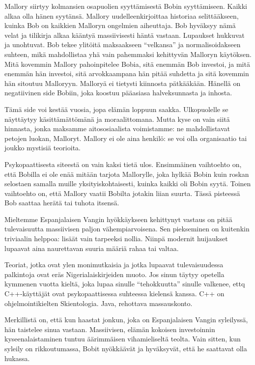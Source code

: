 Mallory siirtyy kolmansien osapuolien syyttämisestä Bobin syyttämiseen. Kaikki alkaa olla hänen syytänsä. Mallory uudelleenkirjoittaa historiaa selittääkseen, kuinka Bob on kaikkien Malloryn ongelmien aiheuttaja. Bob hyväksyy nämä velat ja tilikirja alkaa kääntyä massiivisesti häntä vastaan. Lupaukset hukkuvat ja unohtuvat. Bob tekee ylitöitä maksaakseen ``velkansa'' ja normalisoidakseen suhteen, mikä mahdollistaa yhä vain pahemmaksi kehittyvän Malloryn käytöksen. Mitä kovemmin Mallory pahoinpitelee Bobia, sitä enemmän Bob investoi, ja mitä enemmän hän investoi, sitä arvokkaampana hän pitää suhdetta ja sitä kovemmin hän sitoutuu Malloryyn. Malloryä ei tietysti kiinnosta pätkääkään. Hänellä on negatiivinen side Bobiin, joka koostuu pääasiasa halveksunnasta ja inhosta.

Tämä side voi kestää vuosia, jopa elämän loppuun saakka. Ulkopuolelle se näyttäytyy käsittämättömänä ja moraalittomana. Mutta kyse on vain siitä hinnasta, jonka maksamme aitososiaalista voimistamme: ne mahdollistavat petojen luokan, Malloryt. Mallory ei ole aina henkilö: se voi olla organisaatio tai joukko mystisiä teorioita.

Psykopaattisesta siteestä on vain kaksi tietä ulos. Ensimmäinen vaihtoehto on, että Bobilla ei ole enää mitään tarjota Mallorylle, joka hylkää Bobin kuin roskan selostaen samalla muille yksityiskohtaisesti, kuinka kaikki oli Bobin syytä. Toinen vaihtoehto on, että Mallory vaatii Bobilta jotakin liian suurta. Tässä pisteessä Bob saattaa herätä tai tuhota itsensä.

Mieltemme Espanjalaisen Vangin hyökkäykseen kehittynyt vastaus on pitää tulevaisuutta massiivisen paljon vähempiarvoisena. Sen piekseminen on kuitenkin triviaalin helppoa: lisäät vain tarpeeksi nollia. Niinpä modernit huijaukset lupaavat aina naurettavan suuria määriä rahaa tai valtaa.

Teoriat, jotka ovat ylen monimutkaisia ja jotka lupaavat tulevaisuudessa palkintoja ovat eräs Nigerialaiskirjeiden muoto. Jos sinun täytyy opetella kymmenen vuotta kieltä, joka lupaa sinulle ``tehokkuutta\vmq{,}'' sinulle valkenee, ettq C++-käyttäjät ovat psykopaattisessa suhteessa kielensä kanssa. C++ on ohjelmointikielten Skientologia. Java, rehottava massauskonto.

Merkillistä on, että kun haastat jonkun, joka on Espanjalaisen Vangin syleilyssä, hän taistelee sinua vastaan. Massiivisen, elämän kokoisen investoinnin kyseenalaistaminen tuntuu äärimmäisen vihamieliseltä teolta. Vain sitten, kun syleily on rikkoutumassa, Bobit nyökkäävät ja hyväksyvät, että he saattavat olla hukassa.

